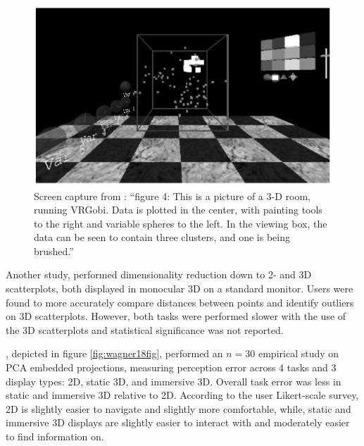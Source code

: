 \documentclass{monashthesis}
\begin{document}
\begin{figure}

{\centering \includegraphics[width=0.7\linewidth]{./figures/nelson98fig} 

}

\caption{Screen capture from \textcite{nelson_xgobi_1998}: ``figure 4: This is a picture of a 3-D room, running VRGobi. Data is plotted in the center, with painting tools to the right and variable spheres to the left. In the viewing box, the data can be seen to contain three clusters, and one is being brushed.''}\label{fig:nelson98fig}
\end{figure}

Another study, \textcite{gracia_new_2016} performed dimensionality reduction down to 2- and 3D scatterplots, both displayed in monocular 3D on a standard monitor. Users were found to more accurately compare distances between points and identify outliers on 3D scatterplots. However, both tasks were performed slower with the use of the 3D scatterplots and statistical significance was not reported.

\textcite{wagner_filho_immersive_2018}, depicted in figure \ref{fig:wagner18fig}, performed an \(n=30\) empirical study on PCA embedded projections, measuring perception error across 4 tasks and 3 display types: 2D, static 3D, and immersive 3D. Overall task error was less in static and immersive 3D relative to 2D. According to the user Likert-scale survey, 2D is slightly easier to navigate and slightly more comfortable, while, static and immersive 3D displays are slightly easier to interact with and moderately easier to find information on.
\end{document}
